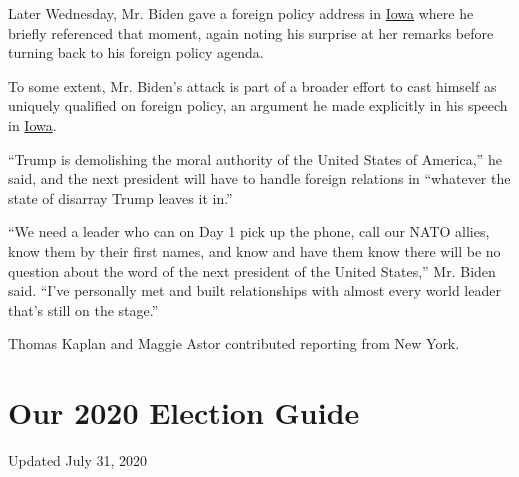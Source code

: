 Later Wednesday, Mr. Biden gave a foreign policy address in
\href{https://www.nytimes.com/2019/11/01/us/politics/iowa-poll-warren-biden.html}{Iowa}
where he briefly referenced that moment, again noting his surprise at
her remarks before turning back to his foreign policy agenda.

To some extent, Mr. Biden's attack is part of a broader effort to cast
himself as uniquely qualified on foreign policy, an argument he made
explicitly in his speech in
\href{https://www.nytimes.com/2019/11/01/us/politics/iowa-poll-warren-biden.html}{Iowa}.

``Trump is demolishing the moral authority of the United States of
America,'' he said, and the next president will have to handle foreign
relations in ``whatever the state of disarray Trump leaves it in.''

``We need a leader who can on Day 1 pick up the phone, call our NATO
allies, know them by their first names, and know and have them know
there will be no question about the word of the next president of the
United States,'' Mr. Biden said. ``I've personally met and built
relationships with almost every world leader that's still on the
stage.''

Thomas Kaplan and Maggie Astor contributed reporting from New York.

\hypertarget{our-2020-election-guide}{%
\section{Our 2020 Election Guide}\label{our-2020-election-guide}}

Updated July 31, 2020

